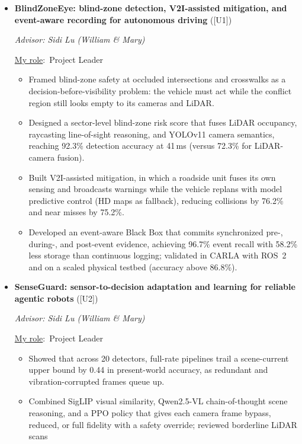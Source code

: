\documentclass[11pt,letterpaper]{article}
\newenvironment{numbered}[1][3.1em]
  {\begin{itemize}[leftmargin=#1, labelwidth=\dimexpr#1-0.5em\relax,
                   labelsep=0.5em, align=left, itemsep=3pt, topsep=2pt]}
  {\end{itemize}}
\newcommand{\myrole}{\underline{My role}:}
\begin{document}
\begin{numbered}[2.2em]
  \item[{[3]}] {\raggedright \textbf{BlindZoneEye: blind-zone detection, V2I-assisted mitigation,
    and event-aware recording for autonomous driving} ([U1])\par}\nobreak
    \textit{Advisor: Sidi Lu (William \& Mary)}\par\nobreak
    \myrole\ Project Leader
    \begin{itemize}
      \item Framed blind-zone safety at occluded intersections and crosswalks as a
        decision-before-visibility problem: the vehicle must act while the
        conflict region still looks empty to its cameras and LiDAR.
      \item Designed a sector-level blind-zone risk score that fuses LiDAR
        occupancy, raycasting line-of-sight reasoning, and YOLOv11 camera
        semantics, reaching 92.3\% detection accuracy at 41\,ms (versus 72.3\%
        for LiDAR-camera fusion).
      \item Built V2I-assisted mitigation, in which a roadside unit fuses its own
        sensing and broadcasts warnings while the vehicle replans with model
        predictive control (HD maps as fallback), reducing collisions by 76.2\%
        and near misses by 75.2\%.
      \item Developed an event-aware Black Box that commits synchronized pre-,
        during-, and post-event evidence, achieving 96.7\% event recall with
        58.2\% less storage than continuous logging; validated in CARLA with
        ROS~2 and on a scaled physical testbed (accuracy above 86.8\%).
    \end{itemize}
  \item[{[2]}] {\raggedright \textbf{SenseGuard: sensor-to-decision adaptation and learning for
    reliable agentic robots} ([U2])\par}\nobreak
    \textit{Advisor: Sidi Lu (William \& Mary)}\par\nobreak
    \myrole\ Project Leader
    \begin{itemize}
      \item Showed that across 20 detectors, full-rate pipelines trail a
        scene-current upper bound by 0.44 in present-world accuracy, as redundant
        and vibration-corrupted frames queue up.
      \item Combined SigLIP visual similarity, Qwen2.5-VL chain-of-thought scene
        reasoning, and a PPO policy that gives each camera frame bypass, reduced,
        or full fidelity with a safety override; reviewed borderline LiDAR scans

\end{itemize}
\end{numbered}
\end{document}
